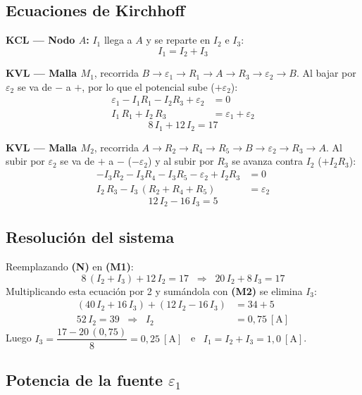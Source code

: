 \documentclass[12pt,letterpaper]{article}
\begin{document}
\subsection*{Ecuaciones de Kirchhoff}

\textbf{KCL --- Nodo $A$:} $I_1$ llega a $A$ y se reparte en $I_2$ e $I_3$:
\[
    \boxed{I_1 = I_2 + I_3} \tag{N}
\]

\textbf{KVL --- Malla $M_1$}, recorrida
$B\to\varepsilon_1\to R_1\to A\to R_3\to\varepsilon_2\to B$. Al bajar por $\varepsilon_2$ se va de
$-$ a $+$, por lo que el potencial sube ($+\varepsilon_2$):
\begin{align*}
    \varepsilon_1 - I_1R_1 - I_2R_3 + \varepsilon_2 &= 0\\[2pt]
    I_1\,R_1 + I_2\,R_3 &= \varepsilon_1 + \varepsilon_2
\end{align*}
\[
    \boxed{8\,I_1 + 12\,I_2 = 17} \tag{M1}
\]

\textbf{KVL --- Malla $M_2$}, recorrida $A\to R_2\to R_4\to R_5\to B\to\varepsilon_2\to R_3\to A$.
Al subir por $\varepsilon_2$ se va de $+$ a $-$ ($-\varepsilon_2$) y al subir por $R_3$ se avanza
contra $I_2$ ($+I_2R_3$):
\begin{align*}
    -I_3R_2 - I_3R_4 - I_3R_5 - \varepsilon_2 + I_2R_3 &= 0\\[2pt]
    I_2\,R_3 - I_3\,(R_2+R_4+R_5) &= \varepsilon_2
\end{align*}
\[
    \boxed{12\,I_2 - 16\,I_3 = 5} \tag{M2}
\]

\subsection*{Resoluci\'on del sistema}

Reemplazando \textbf{(N)} en \textbf{(M1)}:
\[
    8\,(I_2 + I_3) + 12\,I_2 = 17 \;\;\Rightarrow\;\; 20\,I_2 + 8\,I_3 = 17
\]
Multiplicando esta ecuaci\'on por 2 y sum\'andola con \textbf{(M2)} se elimina $I_3$:
\begin{align*}
    (40\,I_2 + 16\,I_3) + (12\,I_2 - 16\,I_3) &= 34 + 5\\[2pt]
    52\,I_2 = 39 \;\;\Rightarrow\;\; I_2 &= 0{,}75\ [\text{A}]
\end{align*}
Luego $I_3 = \dfrac{17 - 20\,(0{,}75)}{8} = 0{,}25\ [\text{A}]$ \ e \
$I_1 = I_2 + I_3 = 1{,}0\ [\text{A}]$.

\subsection*{Potencia de la fuente $\varepsilon_1$}
\end{document}
